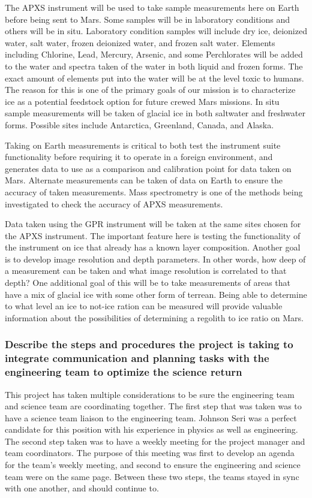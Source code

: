 \documentclass[%
 portrait,
 aapm,
 mph,%
 amsmath,amssymb,
 reprint,%
]{revtex4-2}
\begin{document}
The APXS instrument will be used to take sample measurements here on Earth before being sent to Mars. Some samples will be in laboratory conditions and others will be in situ. Laboratory condition samples will include dry ice, deionized water, salt water, frozen deionized water, and frozen salt water. Elements including Chlorine, Lead, Mercury, Arsenic, and some Perchlorates will be added to the water and spectra taken of the water in both liquid and frozen forms. The exact amount of elements put into the water will be at the level toxic to humans. The reason for this is one of the primary goals of our mission is to characterize ice as a potential feedstock option for future crewed Mars missions. In situ sample measurements will be taken of glacial ice in both saltwater and freshwater forms. Possible sites include Antarctica, Greenland, Canada, and Alaska. 
    
Taking on Earth measurements is critical to both test the instrument suite functionality before requiring it to operate in a foreign environment, and generates data to use as a comparison and calibration point for data taken on Mars. Alternate measurements can be taken of data on Earth to ensure the accuracy of taken measurements. Mass spectrometry is one of the methods being investigated to check the accuracy of APXS measurements. 
    
Data taken using the GPR instrument will be taken at the same sites chosen for the APXS instrument. The important feature here is testing the functionality of the instrument on ice that already has a known layer composition. Another goal is to develop image resolution and depth parameters. In other words, how deep of a measurement can be taken and what image resolution is correlated to that depth? One additional goal of this will be to take measurements of areas that have a mix of glacial ice with some other form of terrean. Being able to determine to what level an ice to not-ice ration can be measured will provide valuable information about the possibilities of determining a regolith to ice ratio on Mars. 


\subsubsection{Describe the steps and procedures the project is taking to integrate communication and planning tasks with the engineering team to optimize the science return}
This project has taken multiple considerations to be sure the engineering team and science team are coordinating together. The first step that was taken was to have a science team liaison to the engineering team. Johnson Seri was a perfect candidate for this position with his experience in physics as well as engineering. The second step taken was to have a weekly meeting for the project manager and team coordinators. The purpose of this meeting was first to develop an agenda for the team's weekly meeting, and second to ensure the engineering and science team were on the same page. Between these two steps, the teams stayed in sync with one another, and should continue to. 
\end{document}
